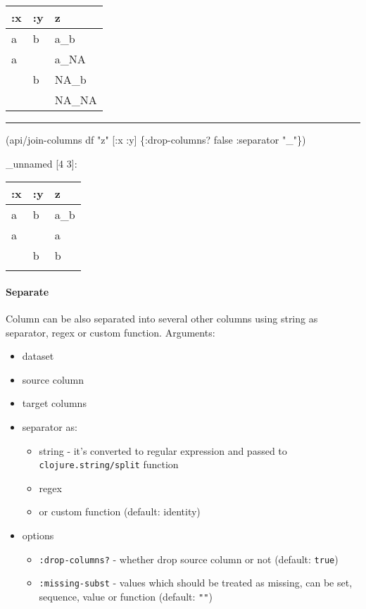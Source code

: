 \documentclass[]{article}
\newenvironment{Shaded}{\begin{snugshade}}{\end{snugshade}}
\newcommand{\StringTok}[1]{\textcolor[rgb]{0.31,0.60,0.02}{#1}}
\newcommand{\VariableTok}[1]{\textcolor[rgb]{0.00,0.00,0.00}{#1}}
\newcommand{\AttributeTok}[1]{\textcolor[rgb]{0.77,0.63,0.00}{#1}}
\newcommand{\NormalTok}[1]{#1}
\providecommand{\tightlist}{%
  \setlength{\itemsep}{0pt}\setlength{\parskip}{0pt}}
\let\oldparagraph\paragraph
\renewcommand{\paragraph}[1]{\oldparagraph{#1}\mbox{}}
\begin{document}
\begin{longtable}[]{@{}lll@{}}
\toprule
:x & :y & z\tabularnewline
\midrule
\endhead
a & b & a\_b\tabularnewline
a & & a\_NA\tabularnewline
& b & NA\_b\tabularnewline
& & NA\_NA\tabularnewline
\bottomrule
\end{longtable}

\begin{center}\rule{0.5\linewidth}{0.5pt}\end{center}

\begin{Shaded}
\begin{Highlighting}[]
\NormalTok{(api/join-columns df }\StringTok{"z"}\NormalTok{ [}\AttributeTok{:x} \AttributeTok{:y}\NormalTok{] \{}\AttributeTok{:drop-columns}\NormalTok{? }\VariableTok{false}
                                  \AttributeTok{:separator} \StringTok{"_"}\NormalTok{\})}
\end{Highlighting}
\end{Shaded}

\_unnamed {[}4 3{]}:

\begin{longtable}[]{@{}lll@{}}
\toprule
:x & :y & z\tabularnewline
\midrule
\endhead
a & b & a\_b\tabularnewline
a & & a\tabularnewline
& b & b\tabularnewline
& &\tabularnewline
\bottomrule
\end{longtable}

\paragraph{Separate}\label{separate}

Column can be also separated into several other columns using string as
separator, regex or custom function. Arguments:

\begin{itemize}
\tightlist
\item
  dataset
\item
  source column
\item
  target columns
\item
  separator as:

  \begin{itemize}
  \tightlist
  \item
    string - it's converted to regular expression and passed to
    \texttt{clojure.string/split} function
  \item
    regex
  \item
    or custom function (default: identity)
  \end{itemize}
\item
  options

  \begin{itemize}
  \tightlist
  \item
    \texttt{:drop-columns?} - whether drop source column or not
    (default: \texttt{true})
  \item
    \texttt{:missing-subst} - values which should be treated as missing,
    can be set, sequence, value or function (default: \texttt{""})
  \end{itemize}
\end{itemize}
\end{document}
